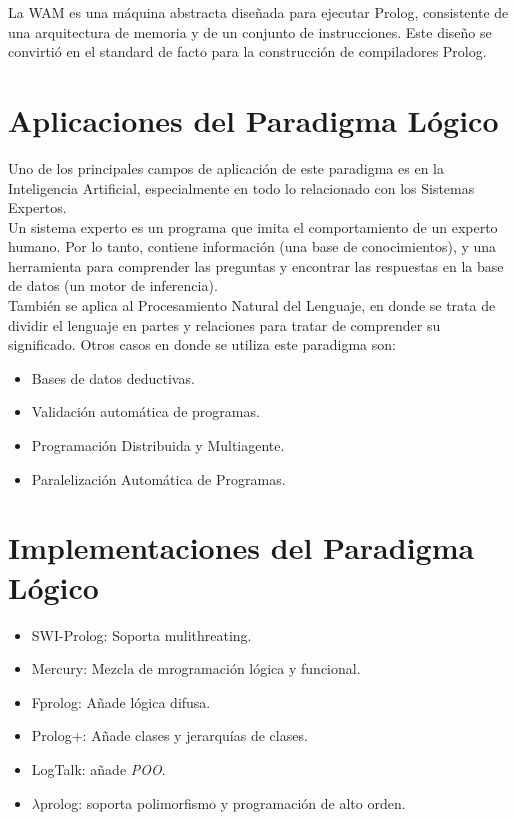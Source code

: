 \documentclass[12pt,titlepage]{article}
\begin{document}
La WAM es una máquina abstracta diseñada para ejecutar Prolog, consistente de una arquitectura de memoria y de un conjunto de instrucciones. Este diseño se convirtió en el standard de facto para la construcción de compiladores Prolog. \\

\newpage

\section{Aplicaciones del Paradigma Lógico}

Uno de los principales campos de aplicación de este paradigma es en la Inteligencia Artificial, especialmente en todo lo relacionado con los Sistemas Expertos. \\

Un sistema experto es un programa que imita el comportamiento de un experto humano. Por lo tanto, contiene información (una base de conocimientos), y una herramienta para comprender las preguntas y encontrar las respuestas en la base de datos (un motor de inferencia). \\

También se aplica al Procesamiento Natural del Lenguaje, en donde se trata de dividir el lenguaje en partes y relaciones para tratar de comprender su significado.
Otros casos en donde se utiliza este paradigma son: \\
\begin{itemize}
    \item Bases de datos deductivas.
    \item Validación automática de programas.
    \item Programación Distribuida y Multiagente.
    \item Paralelización Automática de Programas.
\end{itemize}

\newpage

\section{Implementaciones del Paradigma Lógico}

\begin{itemize}
    \item SWI-Prolog: Soporta mulithreating.
    \item Mercury: Mezcla de mrogramación lógica y funcional.
    \item Fprolog: Añade lógica difusa.
    \item Prolog+: Añade clases y jerarquías de clases.
    \item LogTalk: añade \textit{POO}.
    \item $\lambda$prolog: soporta polimorfismo y programación de alto orden.
\end{itemize}
\end{document}

